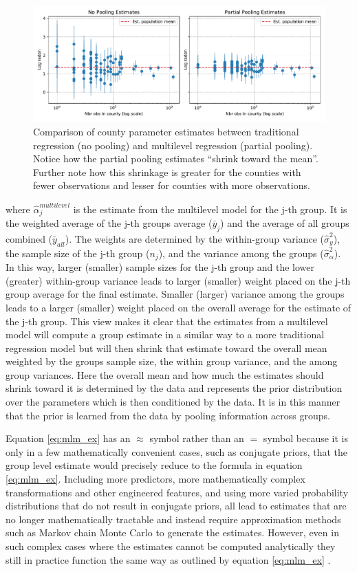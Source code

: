 \begin{figure}
	\centering
	\includegraphics[width=\textwidth]{figures/radon_example.pdf}
	\caption{Comparison of county parameter estimates between traditional regression (no pooling) and multilevel regression (partial pooling). Notice how the partial pooling estimates ``shrink toward the mean''. Further note how this shrinkage is greater for the counties with fewer observations and lesser for counties with more observations.}
	\label{fig:radon_example}
\end{figure}

where $\hat{\alpha}_j^{multilevel}$ is the estimate from the multilevel model for the j-th group. It is the weighted average of the j-th groups average ($\bar{y}_j$) and the average of all groups combined ($\bar{y}_{all}$). The weights are determined by the within-group variance ($\hat{\sigma}_y^2$), the sample size of the j-th group ($n_j$), and the variance among the groups ($\hat{\sigma}_{\alpha}^2$). In this way, larger (smaller) sample sizes for the j-th group and the lower (greater) within-group variance leads to larger (smaller) weight placed on the j-th group average for the final estimate. Smaller (larger) variance among the groups leads to a larger (smaller) weight placed on the overall average for the estimate of the j-th group. This view makes it clear that the estimates from a multilevel model will compute a group estimate in a similar way to a more traditional regression model but will then shrink that estimate toward the overall mean weighted by the groups sample size, the within group variance, and the among group variances. Here the overall mean and how much the estimates should shrink toward it is determined by the data and represents the prior distribution over the parameters which is then conditioned by the data. It is in this manner that the prior is learned from the data by pooling information across groups.

Equation \ref{eq:mlm_ex} has an $\approx$ symbol rather than an $=$ symbol because it is only in a few mathematically convenient cases, such as conjugate priors, that the group level estimate would precisely reduce to the formula in equation \ref{eq:mlm_ex}. Including more predictors, more mathematically complex transformations and other engineered features, and using more varied probability distributions that do not result in conjugate priors, all lead to estimates that are no longer mathematically tractable and instead require approximation methods such as Markov chain Monte Carlo to generate the estimates. However, even in such complex cases where the estimates cannot be computed analytically they still in practice function the same way as outlined by equation \ref{eq:mlm_ex} \cite{Gelman2006}.


